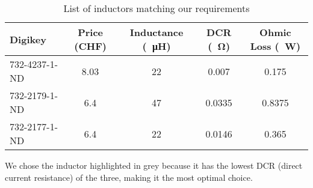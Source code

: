 \begin{table}[th!]
    \begin{center}
        \caption{List of inductors matching our requirements}
        \label{tab:circuit:buck:inductor}
        \begin{tabular}{lcccc}
            \toprule
            Digikey         & Price (CHF) & Inductance (\SI{}{\micro\henry}) & DCR (\SI{}{\ohm}) & Ohmic Loss (\SI{}{\watt}) \\
            \midrule
            \rowcolor{lightgray}
            732-4237-1-ND   & 8.03        & 22                               & 0.007             & 0.175  \\
            732-2179-1-ND   & 6.4         & 47                               & 0.0335            & 0.8375 \\
            732-2177-1-ND   & 6.4         & 22                               & 0.0146            & 0.365  \\
            \bottomrule
        \end{tabular}
    \end{center}
\end{table}

We  chose the  inductor highlighted  in  grey because  it has  the lowest  DCR
(direct current resistance) of the three, making it the most optimal choice.
